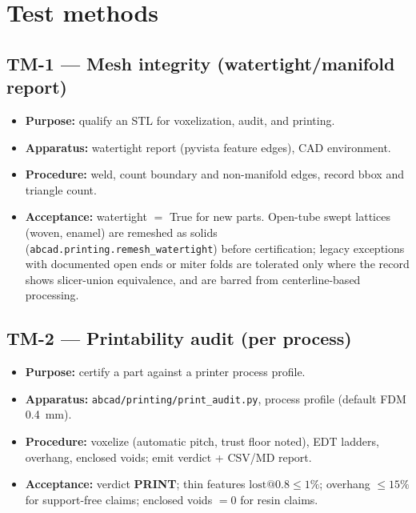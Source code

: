 \documentclass[11pt]{article}
\newcommand{\term}[1]{\textbf{#1}}
\begin{document}
\section{Test methods}

\subsection*{TM-1 --- Mesh integrity (watertight/manifold report)}
\begin{itemize}[nosep]
  \item \textbf{Purpose:} qualify an STL for voxelization, audit, and printing.
  \item \textbf{Apparatus:} watertight report (pyvista feature edges), CAD environment.
  \item \textbf{Procedure:} weld, count boundary and non-manifold edges, record bbox and triangle count.
  \item \textbf{Acceptance:} watertight $=$ True for new parts. Open-tube swept lattices (woven, enamel)
    are remeshed as solids (\texttt{abcad.printing.remesh\_watertight}) before certification; legacy
    exceptions with documented open ends or miter folds are tolerated only where the record shows
    slicer-union equivalence, and are barred from centerline-based processing.
\end{itemize}

\subsection*{TM-2 --- Printability audit (per process)}
\begin{itemize}[nosep]
  \item \textbf{Purpose:} certify a part against a printer process profile.
  \item \textbf{Apparatus:} \texttt{abcad/printing/print\_audit.py}, process profile (default FDM 0.4~mm).
  \item \textbf{Procedure:} voxelize (automatic pitch, trust floor noted), EDT ladders, overhang,
    enclosed voids; emit verdict + CSV/MD report.
  \item \textbf{Acceptance:} verdict \term{PRINT}; thin features $\mathrm{lost}@0.8 \le 1\%$;
    overhang $\le 15\%$ for support-free claims; enclosed voids $=0$ for resin claims.
\end{itemize}
\end{document}
